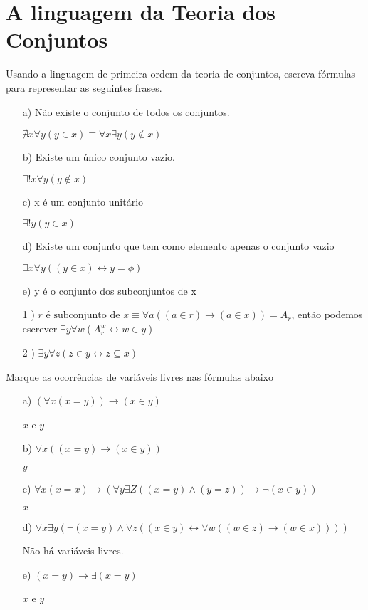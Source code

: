\chapter{A linguagem da Teoria dos Conjuntos}

\begin{exercicio}
	Usando a linguagem de primeira ordem da teoria de conjuntos, escreva fórmulas para representar as seguintes frases.
\end{exercicio}

\begin{solucao}
\begin{enumerate}
	\item[a)] Não existe o conjunto de todos os conjuntos.
    \item[] $\nexists x \forall y (y \in x) \equiv \forall x \exists y (y \notin x)$
	\item[b)] Existe um único conjunto vazio.
    \item[] $\exists ! x \forall y (y \notin x)$
	\item[c)] x é um conjunto unitário
    \item[] $\exists ! y (y \in x)$
	\item[d)] Existe um conjunto que tem como elemento apenas o conjunto vazio
    \item[] $\exists x \forall y ((y \in x) \leftrightarrow y = \phi)$
	\item[e)] y é o conjunto dos subconjuntos de x 
    \item[] 1 ) $r \text{ é subconjunto de } x \equiv \forall a ((a \in r) \rightarrow (a \in x)) = A_r$, então podemos escrever $\exists y \forall w (A_r^w \leftrightarrow w \in y)$
    \item[] 2 ) $ \exists y \forall z (z \in y \leftrightarrow z \subseteq x )$
    
\end{enumerate}

\end{solucao}

\begin{exercicio}
	Marque as ocorrências de variáveis livres nas fórmulas abaixo
\end{exercicio}

\begin{enumerate}
	\item[a)] $(\forall x (x=y)) \rightarrow (x \in y ) $
    \item[] $x$ e $y$
	\item[b)] $ \forall x ((x=y) \rightarrow (x \in y))$
    \item[] $y$
	\item[c)] $\forall x(x=x) \rightarrow (\forall y \exists Z ((x=y) \land (y=z)) \rightarrow \neg(x\in y))$
    \item[] $x$
	\item[d)] $ \forall x \exists y(\neg(x=y) \land \forall z ((x \in y) \leftrightarrow \forall w ((w \in z ) \rightarrow (w \in x )))) $
    \item[] Não há variáveis livres.
	\item[e)] $(x=y)\rightarrow \exists (x=y) $
    \item[] $x$ e $y$
\end{enumerate}


